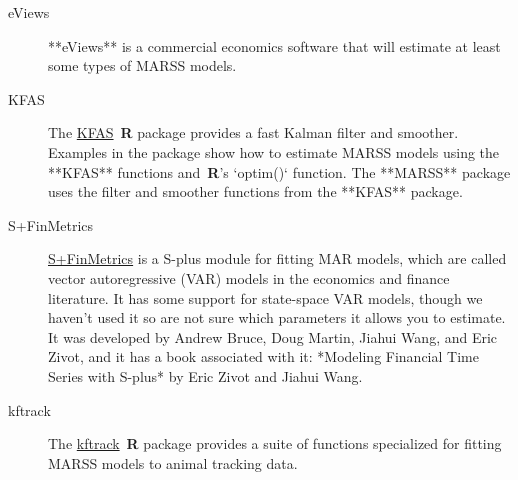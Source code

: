 \documentclass[12pt,]{book}
\begin{document}
\begin{description}
    \item[eViews] **eViews** is a commercial economics software that will estimate at least some types of MARSS models.
    \item[KFAS] The \href{https://cran.r-project.org/package=KFAS}{KFAS} \,\textbf{R} package provides a fast Kalman filter and smoother.  Examples in the package show how to estimate MARSS models using the **KFAS** functions and \,\textbf{R}'s `optim()` function.   The **MARSS** package uses the filter and smoother functions from the **KFAS** package.
        \item[S+FinMetrics] \href{http://faculty.washington.edu/ezivot/MFTS2ndEditionFinMetrics.htm}{S+FinMetrics} is a S-plus module for fitting MAR models, which are called vector autoregressive (VAR) models in the economics and finance literature.  It has some support for state-space VAR models, though we haven't used it so are not sure which parameters it allows you to estimate.  It was developed by Andrew Bruce, Doug Martin, Jiahui Wang, and Eric Zivot, and it has a book associated with it: *Modeling Financial Time Series with S-plus* by Eric Zivot and Jiahui Wang.
        \item[kftrack] The \href{https://github.com/positioning/kalmanfilter/wiki}{kftrack} \,\textbf{R} package provides a suite of functions specialized for fitting MARSS models to animal tracking data.
\end{description}


\end{document}
